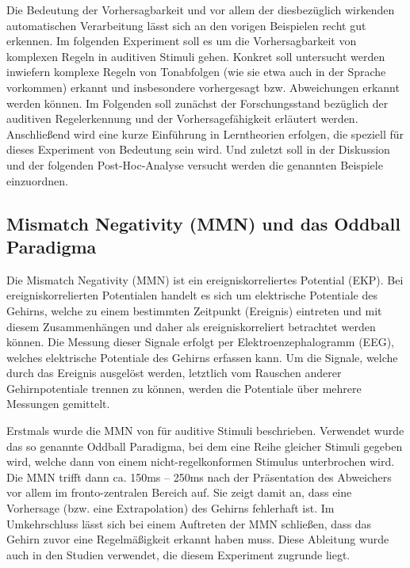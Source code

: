 \documentclass[doc,a4paper,12pt]{apa6}
\begin{document}

Die Bedeutung der Vorhersagbarkeit und vor allem der diesbezüglich wirkenden automatischen Verarbeitung lässt sich an den vorigen Beispielen recht gut erkennen. Im folgenden Experiment soll es um die Vorhersagbarkeit von komplexen Regeln in auditiven Stimuli gehen. Konkret soll untersucht werden inwiefern komplexe Regeln von Tonabfolgen (wie sie etwa auch in der Sprache vorkommen) erkannt und insbesondere vorhergesagt bzw. Abweichungen erkannt werden können. Im Folgenden soll zunächst der Forschungsstand bezüglich der auditiven Regelerkennung und der Vorhersagefähigkeit erläutert werden. Anschließend wird eine kurze Einführung in Lerntheorien erfolgen, die speziell für dieses Experiment von Bedeutung sein wird. Und zuletzt soll in der Diskussion und der folgenden Post-Hoc-Analyse versucht werden die genannten Beispiele einzuordnen.

\subsection{Mismatch Negativity (MMN) und das Oddball Paradigma}

Die Mismatch Negativity (MMN) ist ein ereigniskorreliertes Potential (EKP). Bei ereigniskorrelierten Potentialen handelt es sich um elektrische Potentiale des Gehirns, welche zu einem bestimmten Zeitpunkt (Ereignis) eintreten und mit diesem Zusammenhängen und daher als ereigniskorreliert betrachtet werden können. Die Messung dieser Signale erfolgt per Elektroenzephalogramm (EEG), welches elektrische Potentiale des Gehirns erfassen kann. Um die Signale, welche durch das Ereignis ausgelöst werden, letztlich vom Rauschen anderer Gehirnpotentiale trennen zu können, werden die Potentiale über mehrere Messungen gemittelt.

Erstmals wurde die MMN von \textcite{naatanen1978early} für auditive Stimuli beschrieben. Verwendet wurde das so genannte Oddball Paradigma, bei dem eine Reihe gleicher Stimuli gegeben wird, welche dann von einem nicht-regelkonformen Stimulus unterbrochen wird. Die MMN trifft dann ca. 150ms – 250ms nach der Präsentation des Abweichers vor allem im fronto-zentralen Bereich auf. Sie zeigt damit an, dass eine Vorhersage (bzw. eine Extrapolation) des Gehirns fehlerhaft ist. Im Umkehrschluss lässt sich bei einem Auftreten der MMN schließen, dass das Gehirn zuvor eine Regelmäßigkeit erkannt haben muss. Diese Ableitung wurde auch in den Studien verwendet, die diesem Experiment zugrunde liegt.
\end{document}
